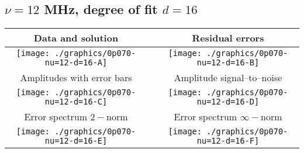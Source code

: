 

% 

\clearpage{}
\break{}

\subsection{$\nu = 12$ MHz, degree of fit $d = 16$}

\begin{table}[h]
    \begin{center}
        \begin{tabular}{ccc}
            Data and solution & \quad & Residual errors \\\hline
            \texttt{[image: ./graphics/0p070-nu=12-d=16-A]} &&
            \texttt{[image: ./graphics/0p070-nu=12-d=16-B]} \\[15pt]
            Amplitudes with error bars && Amplitude signal--to--noise \\\hline
            \texttt{[image: ./graphics/0p070-nu=12-d=16-C]} &&
            \texttt{[image: ./graphics/0p070-nu=12-d=16-D]} \\[15pt]
            Error spectrum $2-$norm && Error spectrum $\infty-$norm \\\hline
            \texttt{[image: ./graphics/0p070-nu=12-d=16-E]} &&
            \texttt{[image: ./graphics/0p070-nu=12-d=16-F]} \\[15pt]
        \end{tabular}
    \end{center}
\label{fig:elev=70, nu=12}
\end{table}



\endinput
